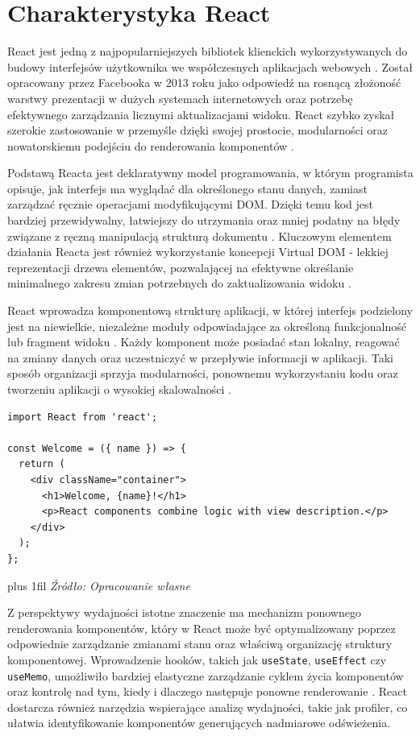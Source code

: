 \documentclass[12pt,openright,twoside]{report}
\newcommand{\source}[1]{{\par\vspace{5pt}\noindent\leftskip=0pt \rightskip=0pt \parfillskip=0pt plus 1fil \footnotesize\textit{Źródło: #1}\par}}
\begin{document}
\section{Charakterystyka React}
React jest jedną z najpopularniejszych bibliotek klienckich wykorzystywanych do budowy interfejsów użytkownika we współczesnych aplikacjach webowych \cite{React_Official, React_Up_Running}. Został opracowany przez Facebooka w 2013 roku jako odpowiedź na rosnącą złożoność warstwy prezentacji w dużych systemach internetowych oraz potrzebę efektywnego zarządzania licznymi aktualizacjami widoku. React szybko zyskał szerokie zastosowanie w przemyśle dzięki swojej prostocie, modularności oraz nowatorskiemu podejściu do renderowania komponentów \cite{React_Official}.

Podstawą Reacta jest deklaratywny model programowania, w którym programista opisuje, jak interfejs ma wyglądać dla określonego stanu danych, zamiast zarządzać ręcznie operacjami modyfikującymi DOM. Dzięki temu kod jest bardziej przewidywalny, łatwiejszy do utrzymania oraz mniej podatny na błędy związane z ręczną manipulacją strukturą dokumentu \cite{React_Official}. Kluczowym elementem działania Reacta jest również wykorzystanie koncepcji Virtual DOM - lekkiej reprezentacji drzewa elementów, pozwalającej na efektywne określanie minimalnego zakresu zmian potrzebnych do zaktualizowania widoku \cite{React_Up_Running}.

React wprowadza komponentową strukturę aplikacji, w której interfejs podzielony jest na niewielkie, niezależne moduły odpowiadające za określoną funkcjonalność lub fragment widoku \cite{Design_Patterns_JS}. Każdy komponent może posiadać stan lokalny, reagować na zmiany danych oraz uczestniczyć w przepływie informacji w aplikacji. Taki sposób organizacji sprzyja modularności, ponownemu wykorzystaniu kodu oraz tworzeniu aplikacji o wysokiej skalowalności \cite{React_Up_Running}.

\begin{lstlisting}[language=tsx, caption={Przykładowy komponent funkcjonalny w React wykorzystujący składnię JavaScript XML (JSX).}, label={lst:react-component-example}]
import React from 'react';

const Welcome = ({ name }) => {
  return (
    <div className="container">
      <h1>Welcome, {name}!</h1>
      <p>React components combine logic with view description.</p>
    </div>
  );
};
\end{lstlisting}
\source{Opracowanie własne}

Z perspektywy wydajności istotne znaczenie ma mechanizm ponownego renderowania komponentów, który w React może być optymalizowany poprzez odpowiednie zarządzanie zmianami stanu oraz właściwą organizację struktury komponentowej. Wprowadzenie hooków, takich jak \texttt{useState}, \texttt{useEffect} czy \texttt{useMemo}, umożliwiło bardziej elastyczne zarządzanie cyklem życia komponentów oraz kontrolę nad tym, kiedy i dlaczego następuje ponowne renderowanie \cite{React_Hooks_Intro}. React dostarcza również narzędzia wspierające analizę wydajności, takie jak profiler, co ułatwia identyfikowanie komponentów generujących nadmiarowe odświeżenia.
\end{document}
